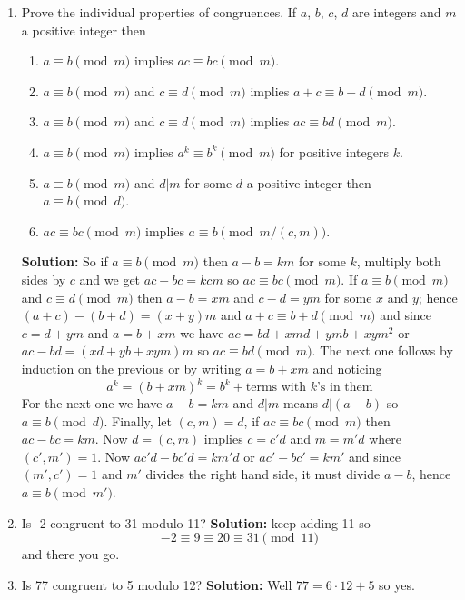 \documentclass[12pt]{article}
\begin{document}
\begin{enumerate}
\item Prove the individual properties of congruences. If $a$, $b$,
  $c$, $d$ are integers and $m$ a positive integer then
\begin{enumerate}
\item $a\equiv b\pmod m$ implies $ac\equiv bc\pmod m$.
\item $a\equiv b\pmod m$ and $c\equiv d\pmod m$ implies $a+c\equiv b+d\pmod m$.
\item $a\equiv b\pmod m$ and $c\equiv d\pmod m$ implies $ac\equiv bd\pmod m$.
\item $a\equiv b\pmod m$ implies $a^k\equiv b^k\pmod m$ for positive integers $k$.
\item $a\equiv b\pmod m$ and $d|m$ for some $d$ a positive integer then $a\equiv b\pmod d$.
\item $ac\equiv bc\pmod m$ implies $a\equiv b\pmod {m/(c,m)}$.
\end{enumerate}
\textbf{Solution: } So if $a\equiv b\pmod m$ then $a-b=km$ for some
$k$, multiply both sides by $c$ and we get $ac-bc=kcm$ so $ac\equiv bc
\pmod m$. If $a\equiv b\pmod m$ and $c\equiv d \pmod m$ then $a-b=xm$
and $c-d=ym$ for some $x$ and $y$; hence $(a+c)-(b+d)=(x+y)m$ and
$a+c\equiv b+d\pmod m$ and since $c=d+ym$ and $a=b+xm$ we have
$ac=bd+xmd+ymb+xym^2$ or $ac-bd=(xd+yb+xym)m$ so $ac\equiv bd \pmod
m$. The next one follows by induction on the previous or by writing
$a=b+xm$ and noticing
\begin{equation}
a^k=(b+xm)^k=b^k+\mbox{terms with }k\mbox{'s in them}
\end{equation}
For the next one we have $a-b=km$ and $d|m$ means $d|(a-b)$ so
$a\equiv b\pmod d$. Finally, let $(c,m)=d$, if $ac\equiv bc \pmod m$
then $ac-bc=km$. Now $d=(c,m)$ implies $c=c'd$ and $m=m'd$ where
$(c',m')=1$. Now $ac'd-bc'd=km'd$ or $ac'-bc'=km'$ and since
$(m',c')=1$ and $m'$ divides the right hand side, it must divide
$a-b$, hence $a\equiv b\pmod {m'}$.

\item Is -2 congruent to 31 modulo 11? \textbf{Solution: } keep adding 11 so 
\begin{equation}
-2\equiv 9\equiv 20\equiv 31\pmod {11}
\end{equation}
and there you go.

\item Is 77 congruent to 5 modulo 12? \textbf{Solution: } Well $77=6\cdot 12+5$ so yes.


\end{enumerate}
\end{document}
